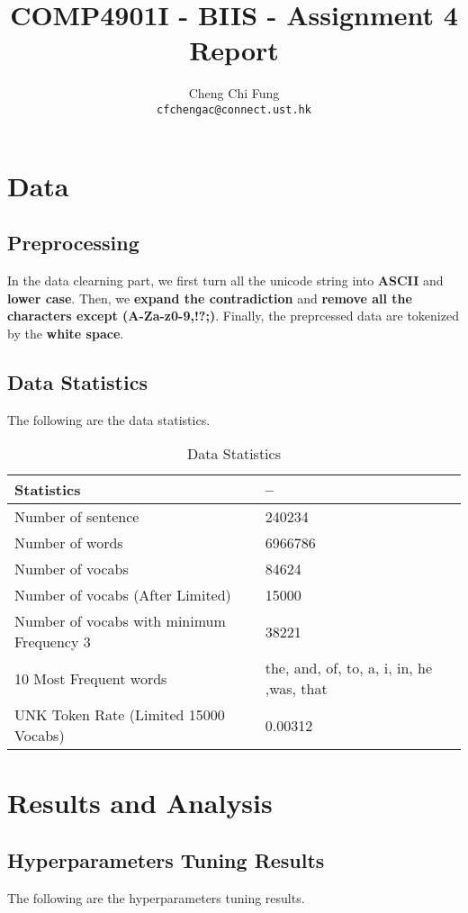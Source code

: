 \documentclass{article}
\title{COMP4901I - BIIS - Assignment 4 Report}
\author{%
	Cheng Chi Fung \\
	\texttt{cfchengac@connect.ust.hk} \\
}
\begin{document}
\maketitle

\section{Data}

\subsection{Preprocessing}

In the data clearning part, we first turn all the unicode string into \textbf{ASCII} and \textbf{lower case}. Then, we \textbf{expand the contradiction} and \textbf{remove all the characters except (A-Za-z0-9,!?;)}. Finally, the preprcessed data are tokenized by the \textbf{white space}. 

\subsection{Data Statistics}
The following are the data statistics.

\begin{table}[htb]
	\caption{Data Statistics}
	\label{sample-table}
	\centering
	\begin{tabular}{ll}
		\toprule
		\cmidrule{1-2}
		Statistics & --  \\
		\midrule
		Number of sentence & 240234 \\
		Number of words & 6966786  \\
		Number of vocabs & 84624 \\
		Number of vocabs (After Limited) & 15000 \\
		Number of vocabs with minimum Frequency 3 & 38221 \\
		10 Most Frequent words & the, and, of, to, a, i, in, he ,was, that \\
		UNK Token Rate (Limited 15000 Vocabs) & 0.00312 \\
		\bottomrule
	\end{tabular}
\end{table}

\section{Results and Analysis}

\subsection{Hyperparameters Tuning Results}
The following are the hyperparameters tuning results.
\end{document}
